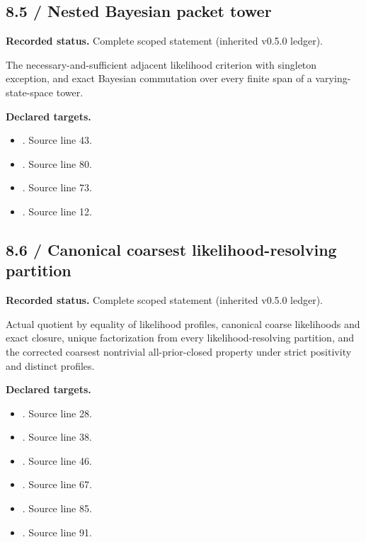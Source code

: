 \subsection{8.5 / Nested Bayesian packet tower}
\label{result:8.5}
\textbf{Recorded status.} Complete scoped statement (inherited v0.5.0 ledger).\par
The necessary-and-sufficient adjacent likelihood criterion with singleton exception, and exact Bayesian commutation over every finite span of a varying-state-space tower.

\textbf{Declared targets.}\begin{itemize}
\item {}. Source line 43.
\item {}. Source line 80.
\item {}. Source line 73.
\item {}. Source line 12.
\end{itemize}
\subsection{8.6 / Canonical coarsest likelihood-resolving partition}
\label{result:8.6}
\textbf{Recorded status.} Complete scoped statement (inherited v0.5.0 ledger).\par
Actual quotient by equality of likelihood profiles, canonical coarse likelihoods and exact closure, unique factorization from every likelihood-resolving partition, and the corrected coarsest nontrivial all-prior-closed property under strict positivity and distinct profiles.

\textbf{Declared targets.}\begin{itemize}
\item {}. Source line 28.
\item {}. Source line 38.
\item {}. Source line 46.
\item {}. Source line 67.
\item {}. Source line 85.
\item {}. Source line 91.
\end{itemize}
